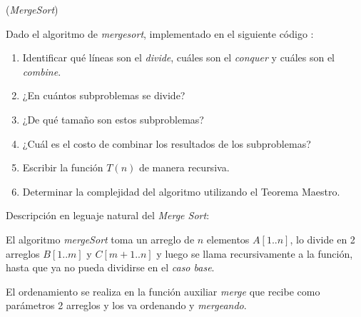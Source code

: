 \begin{enunciado}{\ejercicio[MergeSort]}
  (\textit{MergeSort})

  Dado el algoritmo de \textit{mergesort}, implementado en el siguiente código \python:

  \begin{minipage}{0.49\textwidth}
  \end{minipage}
  \begin{minipage}{0.47\textwidth}
  \end{minipage}

  \begin{enumerate}[label=\arabic*)]
    \item Identificar qué líneas son el \textit{divide}, cuáles son el \textit{conquer} y cuáles son el \textit{combine}.

    \item ¿En cuántos subproblemas se divide?

    \item ¿De qué tamaño son estos subproblemas?

    \item ¿Cuál es el costo de combinar los resultados de los subproblemas?

    \item Escribir la función $T(n)$ de manera recursiva.

    \item Determinar la complejidad del algoritmo utilizando el Teorema Maestro.
  \end{enumerate}
\end{enunciado}

Descripción en leguaje natural del \textit{Merge Sort}:

El algoritmo \textit{mergeSort} toma un arreglo de $n$ elementos $A[1 .. n]$, lo divide en 2 arreglos
$B[1 .. m]$ y $C[m + 1 .. n]$ y luego se llama recursivamente a la función, hasta que ya no pueda dividirse en el \textit{caso base}.

El ordenamiento se realiza en la función auxiliar \textit{merge}
que recibe como parámetros 2 arreglos y los va ordenando y \textit{mergeando}.

